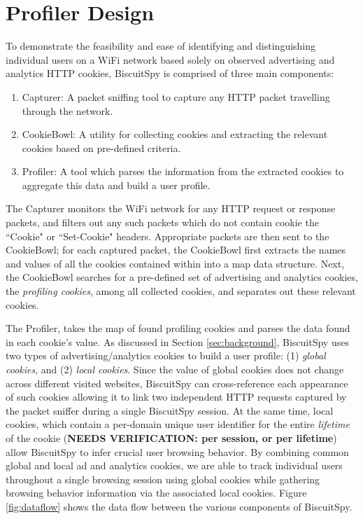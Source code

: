\section{Profiler Design}
\label{sec:design}

To demonstrate the feasibility and ease of identifying and distinguishing individual users on a WiFi network based solely on observed advertising and analytics HTTP cookies, BiscuitSpy is comprised of three main components: 
\begin{enumerate}
\item Capturer: A packet sniffing tool to capture any HTTP packet travelling through the network.
\item CookieBowl: A utility for collecting cookies and extracting the relevant cookies based on pre-defined criteria.
\item Profiler: A tool which parses the information from the extracted cookies to aggregate this data and build a user profile.
\end{enumerate}

The Capturer monitors the WiFi network for any HTTP request or response packets, and filters out any such packets which do not contain cookie the ``Cookie" or ``Set-Cookie" headers. 
Appropriate packets are then sent to the CookieBowl; for each captured packet, the CookieBowl first extracts the names and values of all the cookies contained within into a map data structure.
Next, the CookieBowl searches for a pre-defined set of advertising and analytics cookies, the \emph{profiling cookies}, among all collected cookies, and separates out these relevant cookies.

The Profiler, takes the map of found profiling cookies and parses the data found in each cookie's value. 
As discussed in Section \ref{sec:background}, BiscuitSpy uses two types of advertising/analytics cookies to build a user profile: (1) \emph{global cookies}, and (2) \emph{local cookies}.
Since the value of global cookies does not change across different visited websites, BiscuitSpy can cross-reference each appearance of such cookies allowing it to link two independent HTTP requests captured by the packet sniffer during a single BiscuitSpy session. 
At the same time, local cookies, which contain a per-domain unique user identifier for the entire \emph{lifetime} of the cookie (\textbf{NEEDS VERIFICATION: per session, or per lifetime}) allow BiscuitSpy to infer crucial user browsing behavior.
By combining common global and local ad and analytics cookies, we are able to track individual users throughout a single browsing session using global cookies while gathering browsing behavior information via the associated local cookies.
Figure \ref{fig:dataflow} shows the data flow between the various components of BiscuitSpy.


